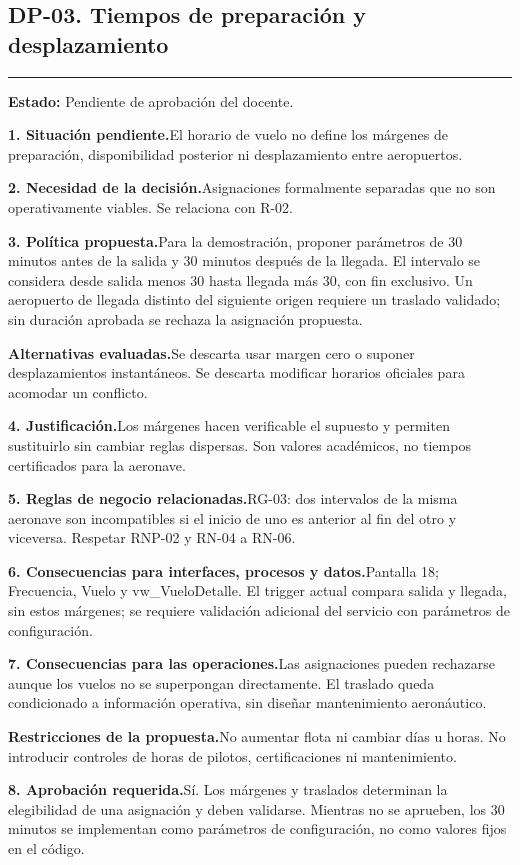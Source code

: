 \documentclass[11pt,a4paper]{article}
\newcommand{\fichacampo}[2]{\noindent\textbf{\color{azulvip}#1}\enspace #2\par\vspace{3pt}}
\begin{document}
\subsection{DP-03. Tiempos de preparación y desplazamiento}
{\color{doradovip}\rule{\textwidth}{.5pt}}
\textbf{Estado:} Pendiente de aprobación del docente.\par\vspace{4pt}
{\normalsize
\fichacampo{1. Situación pendiente.}{El horario de vuelo no define los márgenes de preparación, disponibilidad posterior ni desplazamiento entre aeropuertos.}
\fichacampo{2. Necesidad de la decisión.}{Asignaciones formalmente separadas que no son operativamente viables. Se relaciona con R-02.}
\fichacampo{3. Política propuesta.}{Para la demostración, proponer parámetros de 30 minutos antes de la salida y 30 minutos después de la llegada. El intervalo se considera desde salida menos 30 hasta llegada más 30, con fin exclusivo. Un aeropuerto de llegada distinto del siguiente origen requiere un traslado validado; sin duración aprobada se rechaza la asignación propuesta.}
\fichacampo{Alternativas evaluadas.}{Se descarta usar margen cero o suponer desplazamientos instantáneos. Se descarta modificar horarios oficiales para acomodar un conflicto.}
\fichacampo{4. Justificación.}{Los márgenes hacen verificable el supuesto y permiten sustituirlo sin cambiar reglas dispersas. Son valores académicos, no tiempos certificados para la aeronave.}
\fichacampo{5. Reglas de negocio relacionadas.}{RG-03: dos intervalos de la misma aeronave son incompatibles si el inicio de uno es anterior al fin del otro y viceversa. Respetar RNP-02 y RN-04 a RN-06.}
\fichacampo{6. Consecuencias para interfaces, procesos y datos.}{Pantalla 18; Frecuencia, Vuelo y vw\_VueloDetalle. El trigger actual compara salida y llegada, sin estos márgenes; se requiere validación adicional del servicio con parámetros de configuración.}
\fichacampo{7. Consecuencias para las operaciones.}{Las asignaciones pueden rechazarse aunque los vuelos no se superpongan directamente. El traslado queda condicionado a información operativa, sin diseñar mantenimiento aeronáutico.}
\fichacampo{Restricciones de la propuesta.}{No aumentar flota ni cambiar días u horas. No introducir controles de horas de pilotos, certificaciones ni mantenimiento.}
\fichacampo{8. Aprobación requerida.}{Sí. Los márgenes y traslados determinan la elegibilidad de una asignación y deben validarse. Mientras no se aprueben, los 30 minutos se implementan como parámetros de configuración, no como valores fijos en el código.}
}
\clearpage
\end{document}
